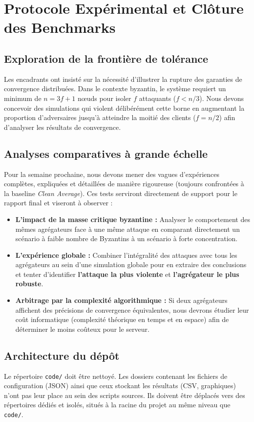 \documentclass[11pt, a4paper]{article}
\begin{document}
\section{Protocole Expérimental et Clôture des Benchmarks}

\subsection{Exploration de la frontière de tolérance}
Les encadrants ont insisté sur la nécessité d'illustrer la rupture des garanties de convergence distribuées. Dans le contexte byzantin, le système requiert un minimum de $n = 3f + 1$ nœuds pour isoler $f$ attaquants ($f < n/3$). Nous devons concevoir des simulations qui violent délibérément cette borne en augmentant la proportion d'adversaires jusqu'à atteindre la moitié des clients ($f = n/2$) afin d'analyser les résultats de convergence.

\subsection{Analyses comparatives à grande échelle}
Pour la semaine prochaine, nous devons mener des vagues d'expériences complètes, expliquées et détaillées de manière rigoureuse (toujours confrontées à la baseline \textit{Clean Average}). Ces tests serviront directement de support pour le rapport final et viseront à observer :
\begin{itemize}
    \item \textbf{L'impact de la masse critique byzantine :} Analyser le comportement des mêmes agrégateurs face à une même attaque en comparant directement un scénario à faible nombre de Byzantins à un scénario à forte concentration.
    \item \textbf{L'expérience globale :} Combiner l'intégralité des attaques avec tous les agrégateurs au sein d'une simulation globale pour en extraire des conclusions et tenter d'identifier \textbf{l'attaque la plus violente} et \textbf{l'agrégateur le plus robuste}.
    \item \textbf{Arbitrage par la complexité algorithmique :} Si deux agrégateurs affichent des précisions de convergence équivalentes, nous devrons étudier leur coût informatique (complexité théorique en temps et en espace) afin de déterminer le moins coûteux pour le serveur.
\end{itemize}

\subsection{Architecture du dépôt}
Le répertoire \texttt{code/} doit être nettoyé. Les dossiers contenant les fichiers de configuration (JSON) ainsi que ceux stockant les résultats (CSV, graphiques) n'ont pas leur place au sein des scripts sources. Ils doivent être déplacés vers des répertoires dédiés et isolés, situés à la racine du projet au même niveau que \texttt{code/}.
\end{document}
